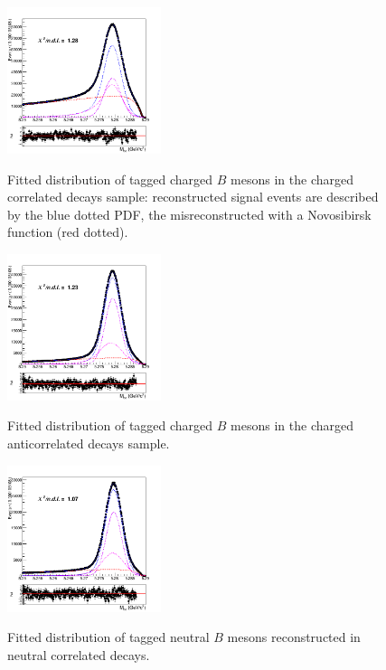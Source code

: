 \begin{figure}[H]
\centering
{\includegraphics[width=0.40\textwidth]{05-BtagFit/figs/chargedBtag_corrLambdaC_TotalSignalBtag_fit.png}}
\caption{Fitted distribution of tagged charged $B$ mesons in the charged correlated decays sample: reconstructed signal events are described by the blue dotted PDF, the misreconstructed with a Novosibirsk function (red dotted). }
\label{fig:chargedBtag_corrLambdaC_TotalSignalBtag_fit}
\end{figure}

\begin{figure}[H]
    \centering
    {\includegraphics[width=0.40\textwidth]{05-BtagFit/figs/stream1_anticorr_chargedBtag_Total_Signal_fit.png}}
    \caption{Fitted distribution of tagged charged $B$ mesons  in the charged anticorrelated decays sample. }
    \label{fig:anticorr_chargedBtag_Total_Signal_fit}
    \end{figure}

\begin{figure}[H]
\centering
{\includegraphics[width=0.40\textwidth]{05-BtagFit/figs/stream0_neutralBtag_corrLambdaC_TotalSignal_addedGaussian.png}}
\caption{Fitted distribution of tagged neutral $B$ mesons reconstructed in neutral correlated decays. }
\label{fig:stream0_neutralBtag_corrLambdaC_TotalSignal_addedGaussian}
\end{figure}

